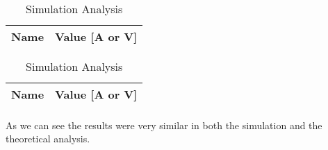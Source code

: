 \begin{table}[!htb]
    \begin{minipage}{0.5\linewidth}
        \centering
        \caption{Theoretical Analysis}
        \begin{tabular}{|l|l|}
            \hline
            {\bf Name} & {\bf Value [A or V]} \\ \hline
            
        \end{tabular}
        \label{tab:tabela4}
    \end{minipage}%
    \begin{minipage}{0.5\linewidth}
        \centering
        \caption{Simulation Analysis}
        \begin{tabular}{|l|l|}
            \hline
            {\bf Name} & {\bf Value [A or V]} \\ \hline
            
        \end{tabular}
    \end{minipage}
\end{table}

\paragraph{} As we can see the results were very similar in both the simulation and the theoretical
analysis.
